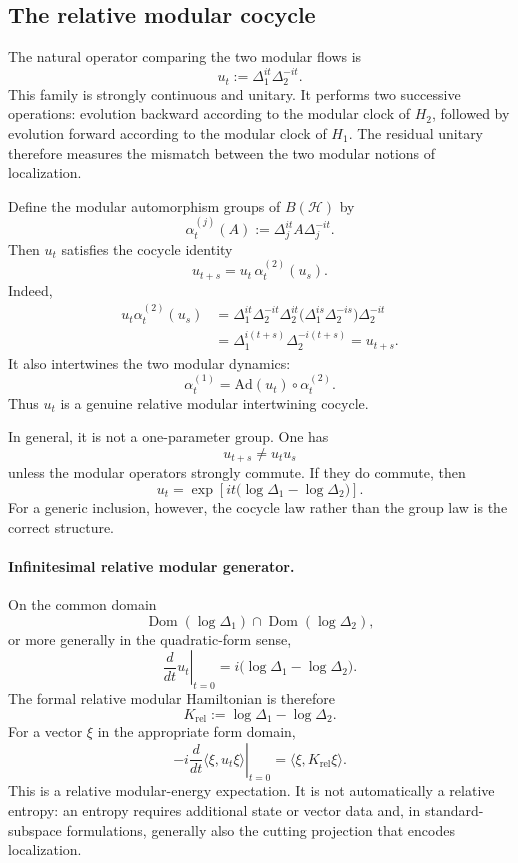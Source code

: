 \documentclass[a4paper,11pt]{article}
\theoremstyle{definition}
\newcommand{\cH}{\mathcal{H}}
\newcommand{\Dom}{\operatorname{Dom}}
\begin{document}
\subsection*{The relative modular cocycle}

The natural operator comparing the two modular flows is
\[
\boxed{
   u_t:=\Delta_1^{it}\Delta_2^{-it}.
}
\]
This family is strongly continuous and unitary.  It performs two
successive operations: evolution backward according to the modular clock
of $H_2$, followed by evolution forward according to the modular clock of
$H_1$.  The residual unitary therefore measures the mismatch between the
two modular notions of localization.

Define the modular automorphism groups of $B(\cH)$ by
\[
\alpha_t^{(j)}(A)
   :=\Delta_j^{it}A\Delta_j^{-it}.
\]
Then $u_t$ satisfies the cocycle identity
\[
\boxed{
   u_{t+s}=u_t\,\alpha_t^{(2)}(u_s).
}
\]
Indeed,
\begin{align*}
 u_t\alpha_t^{(2)}(u_s)
 &=\Delta_1^{it}\Delta_2^{-it}
   \Delta_2^{it}
   \bigl(\Delta_1^{is}\Delta_2^{-is}\bigr)
   \Delta_2^{-it} \\
 &=\Delta_1^{i(t+s)}\Delta_2^{-i(t+s)}
 =u_{t+s}.
\end{align*}
It also intertwines the two modular dynamics:
\[
\boxed{
   \alpha_t^{(1)}
   =\text{Ad}(u_t)\circ\alpha_t^{(2)}.
}
\]
Thus $u_t$ is a genuine relative modular intertwining cocycle.

In general, it is not a one-parameter group.  One has
\[
 u_{t+s}\neq u_tu_s
\]
unless the modular operators strongly commute.  If they do commute, then
\[
 u_t
 =\exp\!\left[it\bigl(\log\Delta_1-\log\Delta_2\bigr)\right].
\]
For a generic inclusion, however, the cocycle law rather than the group
law is the correct structure.

\paragraph{Infinitesimal relative modular generator.}
On the common domain
\[
\Dom(\log\Delta_1)\cap\Dom(\log\Delta_2),
\]
or more generally in the quadratic-form sense,
\[
\boxed{
   \left.\frac{d}{dt}u_t\right|_{t=0}
   =i\bigl(\log\Delta_1-\log\Delta_2\bigr).
}
\]
The formal relative modular Hamiltonian is therefore
\[
K_{\mathrm{rel}}
   :=\log\Delta_1-\log\Delta_2.
\]
For a vector $\xi$ in the appropriate form domain,
\[
-i\left.\frac{d}{dt}
  \langle\xi,u_t\xi\rangle\right|_{t=0}
=
\langle\xi,K_{\mathrm{rel}}\xi\rangle.
\]
This is a relative modular-energy expectation.  It is not automatically a
relative entropy: an entropy requires additional state or vector data and,
in standard-subspace formulations, generally also the cutting projection
that encodes localization.
\end{document}
